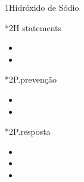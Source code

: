 \begin{sectionBox}1{Hidróxido de Sódio}

    \begin{sectionBox}{}
        \begin{multicols}{3}
        \end{multicols}
    \end{sectionBox}

    \begin{sectionBox}*2{H statements}
        \begin{itemize}
            \item {}
            \item {}
        \end{itemize}
    \end{sectionBox}

    \begin{sectionBox}*2{P.prevenção}
        \begin{itemize}
            \item {}
            \item {}
        \end{itemize}
    \end{sectionBox}

    \begin{sectionBox}*2{P.resposta}
        \begin{itemize}
            \item {}
            \item {}
            \item {}
        \end{itemize}
    \end{sectionBox}

\end{sectionBox}










